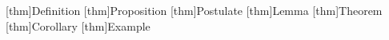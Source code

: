 \newtheorem{thm}{thm}[\majorcounter]

{
    \theoremstyle{blockmajor}
    \theoremheaderfont{\normalfont\bfseries}
    \theorembodyfont{\slshape}
    \theoremsymbol{}

    [thm]{Definition}
    [thm]{Proposition}
    [thm]{Postulate}
    [thm]{Lemma}
    [thm]{Theorem}
    [thm]{Corollary}
    [thm]{Example}
}
